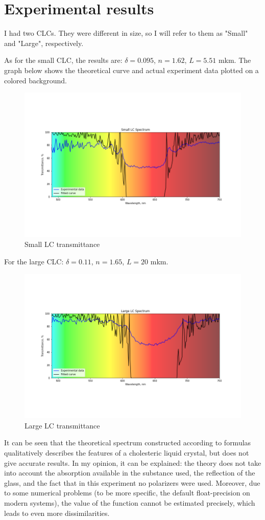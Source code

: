 \documentclass[a4paper, 12pt]{article}
\begin{document}
\section*{Experimental results}
I had two CLCs. They were different in size, so I will refer to them as "Small" and "Large", respectively. 

As for the small CLC, the results are: $\delta = 0.095$, $n = 1.62$, $L = 5.51$ mkm. The graph below shows the theoretical curve and actual experiment data plotted on a colored background.
\begin{figure}[H]
\centering
\includegraphics[width=1\linewidth]{SmallLC.png}
\caption{Small LC transmittance}
\label{fig:3}
\end{figure}
For the large CLC: $\delta = 0.11$, $n = 1.65$, $L = 20$ mkm.

\begin{figure}[H]
\centering
\includegraphics[width=1\linewidth]{LargeLC.png}
\caption{Large LC transmittance}
\label{fig:4}
\end{figure}
It can be seen that the theoretical spectrum constructed according to formulas qualitatively describes the features of a cholesteric liquid crystal, but does not give accurate results. In my opinion, it can be explained: the theory does not take into account the absorption available in the substance used, the reflection of the glass, and the fact that in this experiment no polarizers were used. Moreover, due to some numerical problems (to be more specific, the default float-precision on modern systems), the value of the function cannot be estimated precisely, which leads to even more dissimilarities.
\end{document}
